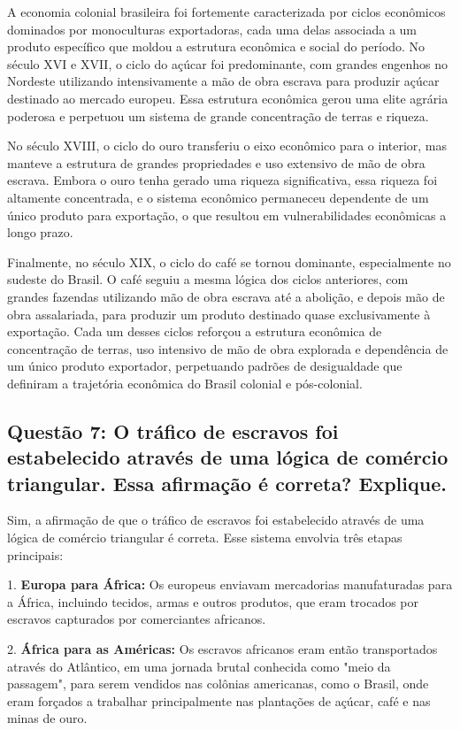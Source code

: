\documentclass[a4paper,12pt]{article}[abntex2]
\begin{document}
A economia colonial brasileira foi fortemente caracterizada por ciclos econômicos dominados por monoculturas exportadoras, cada uma delas associada a um produto específico que moldou a estrutura econômica e social do período. No século XVI e XVII, o ciclo do açúcar foi predominante, com grandes engenhos no Nordeste utilizando intensivamente a mão de obra escrava para produzir açúcar destinado ao mercado europeu. Essa estrutura econômica gerou uma elite agrária poderosa e perpetuou um sistema de grande concentração de terras e riqueza.

No século XVIII, o ciclo do ouro transferiu o eixo econômico para o interior, mas manteve a estrutura de grandes propriedades e uso extensivo de mão de obra escrava. Embora o ouro tenha gerado uma riqueza significativa, essa riqueza foi altamente concentrada, e o sistema econômico permaneceu dependente de um único produto para exportação, o que resultou em vulnerabilidades econômicas a longo prazo.

Finalmente, no século XIX, o ciclo do café se tornou dominante, especialmente no sudeste do Brasil. O café seguiu a mesma lógica dos ciclos anteriores, com grandes fazendas utilizando mão de obra escrava até a abolição, e depois mão de obra assalariada, para produzir um produto destinado quase exclusivamente à exportação. Cada um desses ciclos reforçou a estrutura econômica de concentração de terras, uso intensivo de mão de obra explorada e dependência de um único produto exportador, perpetuando padrões de desigualdade que definiram a trajetória econômica do Brasil colonial e pós-colonial.

\subsection{\textbf{Questão 7: O tráfico de escravos foi estabelecido através de uma lógica de comércio triangular. Essa afirmação é correta? Explique.}}

Sim, a afirmação de que o tráfico de escravos foi estabelecido através de uma lógica de comércio triangular é correta. Esse sistema envolvia três etapas principais: 

1. \textbf{Europa para África:} Os europeus enviavam mercadorias manufaturadas para a África, incluindo tecidos, armas e outros produtos, que eram trocados por escravos capturados por comerciantes africanos.

2. \textbf{África para as Américas:} Os escravos africanos eram então transportados através do Atlântico, em uma jornada brutal conhecida como "meio da passagem", para serem vendidos nas colônias americanas, como o Brasil, onde eram forçados a trabalhar principalmente nas plantações de açúcar, café e nas minas de ouro.
\end{document}
